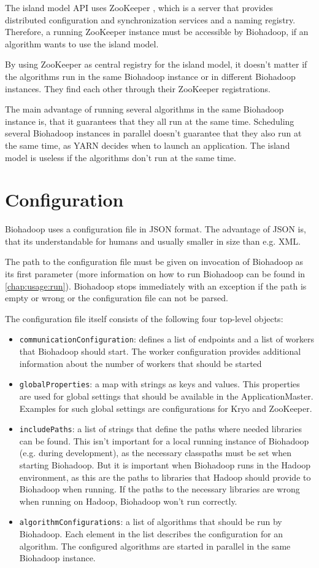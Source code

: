The island model API uses ZooKeeper \cite{zookeeper}, which is a server that provides distributed configuration and synchronization services and a naming registry. Therefore, a running ZooKeeper instance must be accessible by Biohadoop, if an algorithm wants to use the island model.

By using ZooKeeper as central registry for the island model, it doesn't matter if the algorithms run in the same Biohadoop instance or in different Biohadoop instances. They find each other through their ZooKeeper registrations.

The main advantage of running several algorithms in the same Biohadoop instance is, that it guarantees that they all run at the same time. Scheduling several Biohadoop instances in parallel doesn't guarantee that they also run at the same time, as YARN decides when to launch an application. The island model is useless if the algorithms don't run at the same time.

\section{Configuration}
\label{chap:impl:configuration}
Biohadoop uses a configuration file in JSON format. The advantage of JSON is, that its understandable for humans and usually smaller in size than e.g. XML.

The path to the configuration file must be given on invocation of Biohadoop as its first parameter (more information on how to run Biohadoop can be found in \ref{chap:usage:run}). Biohadoop stops immediately with an exception if the path is empty or wrong or the configuration file can not be parsed.

The configuration file itself consists of the following four top-level objects:
\begin{itemize}
  \item \texttt{communicationConfiguration}: defines a list of endpoints and a list of workers that Biohadoop should start. The worker configuration provides additional information about the number of workers that should be started
  \item \texttt{globalProperties}: a map with strings as keys and values. This properties are used for global settings that should be available in the ApplicationMaster. Examples for such global settings are configurations for Kryo and ZooKeeper.
  \item \texttt{includePaths}: a list of strings that define the paths where needed libraries can be found. This isn't important for a local running instance of Biohadoop (e.g. during development), as the necessary classpaths must be set when starting Biohadoop. But it is important when Biohadoop runs in the Hadoop environment, as this are the paths to libraries that Hadoop should provide to Biohadoop when running. If the paths to the necessary libraries are wrong when running on Hadoop, Biohadoop won't run correctly.
  \item \texttt{algorithmConfigurations}: a list of algorithms that should be run by Biohadoop. Each element in the list describes the configuration for an algorithm. The configured algorithms are started in parallel in the same Biohadoop instance.
\end{itemize}

